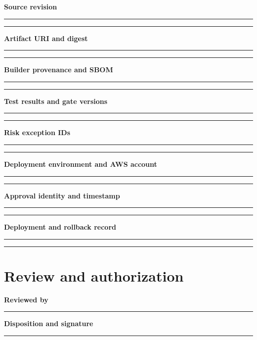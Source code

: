 \documentclass[10pt,letterpaper]{article}
\begin{document}
\textbf{Source revision}\par
\noindent\rule{\linewidth}{0.35pt}\par\vspace{0.7em}
\noindent\rule{\linewidth}{0.35pt}\par\vspace{0.7em}
\textbf{Artifact URI and digest}\par
\noindent\rule{\linewidth}{0.35pt}\par\vspace{0.7em}
\noindent\rule{\linewidth}{0.35pt}\par\vspace{0.7em}
\textbf{Builder provenance and SBOM}\par
\noindent\rule{\linewidth}{0.35pt}\par\vspace{0.7em}
\noindent\rule{\linewidth}{0.35pt}\par\vspace{0.7em}
\textbf{Test results and gate versions}\par
\noindent\rule{\linewidth}{0.35pt}\par\vspace{0.7em}
\noindent\rule{\linewidth}{0.35pt}\par\vspace{0.7em}
\textbf{Risk exception IDs}\par
\noindent\rule{\linewidth}{0.35pt}\par\vspace{0.7em}
\noindent\rule{\linewidth}{0.35pt}\par\vspace{0.7em}
\textbf{Deployment environment and AWS account}\par
\noindent\rule{\linewidth}{0.35pt}\par\vspace{0.7em}
\noindent\rule{\linewidth}{0.35pt}\par\vspace{0.7em}
\textbf{Approval identity and timestamp}\par
\noindent\rule{\linewidth}{0.35pt}\par\vspace{0.7em}
\noindent\rule{\linewidth}{0.35pt}\par\vspace{0.7em}
\textbf{Deployment and rollback record}\par
\noindent\rule{\linewidth}{0.35pt}\par\vspace{0.7em}
\noindent\rule{\linewidth}{0.35pt}\par\vspace{0.7em}
\section{Review and authorization}
\textbf{Reviewed by}\par
\noindent\rule{\linewidth}{0.35pt}\par\vspace{0.7em}
\textbf{Disposition and signature}\par
\noindent\rule{\linewidth}{0.35pt}\par\vspace{0.7em}
\end{document}
